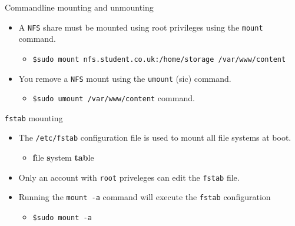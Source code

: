 \documentclass[xcolor=table]{beamer}
\begin{document}
\begin{frame}{Commandline mounting and unmounting}
  \begin{itemize}
    \item A \texttt{NFS} share must be mounted using root privileges using the \texttt{mount} command.
      \begin{itemize}
        \item \scriptsize \texttt{\$sudo mount nfs.student.co.uk:/home/storage /var/www/content}
      \end{itemize}
    \item You remove a \texttt{NFS} mount using the \texttt{umount} (sic) command.
      \begin{itemize}
        \item \texttt{\$sudo umount /var/www/content} command. 
      \end{itemize}
  \end{itemize}
\end{frame}

\begin{frame}{\texttt{fstab} mounting}
  \begin{itemize}
    \item The \texttt{/etc/fstab} configuration file is used to mount all file systems at boot.
      \begin{itemize}
        \item \textbf{f}ile \textbf{s}ystem \textbf{tab}le
      \end{itemize}
    \item Only an account with \texttt{root} priveleges can edit the \texttt{fstab} file.
    \item Running the \texttt{mount -a} command will execute the \texttt{fstab} configuration
      \begin{itemize}
        \item \texttt{\$sudo mount -a} 
      \end{itemize}
  \end{itemize}
\end{frame}
\end{document}
